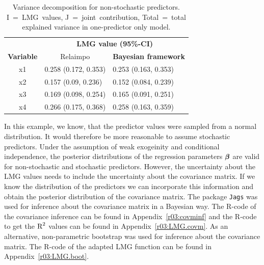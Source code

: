 \documentclass[11pt,a4paper,twoside]{book}\usepackage[]{graphicx}\usepackage[]{color}
\begin{document}
\begin{table}[h]
\caption{Variance decomposition for non-stochastic predictors. I~=~LMG~values, J~=~joint~contribution, Total~=~total explained variance in one-predictor only model.}
\centering
\begin{tabular}{cll}
   \toprule
   &\multicolumn{2}{c}{\textbf{LMG value (95\%-CI)}} \\
 \textbf{Variable} & \multicolumn{1}{c}{Relaimpo} & \textbf{Bayesian framework}  \\
  \hline
x1 & 0.258 (0.172, 0.353)  & 0.253 (0.163, 0.353)  \\ 
x2 & 0.157 (0.09, 0.236)  & 0.152 (0.084, 0.239)   \\ 
x3 & 0.169 (0.098, 0.254)  & 0.165 (0.091, 0.251)  \\ 
x4 & 0.266 (0.175, 0.368) & 0.258 (0.163, 0.359)  \\ 
   \bottomrule
\end{tabular}
\label{tbl:nonstochEx1relamip}
\end{table}

\FloatBarrier


In this example, we know, that the predictor values were sampled from a normal distribution. It would therefore be more reasonable to assume stochastic predictors. Under the assumption of weak exogeinity and conditional independence, the posterior distributions of the regression parameters ${\boldsymbol{\beta}}$ are valid for non-stochastic and stochastic predictors. However, the uncertainty about the LMG values needs to include the uncertainty about the covariance matrix. If we know the distribution of the predictors we can incorporate this information and obtain the posterior distribution of the covariance matrix. The package \texttt{Jags} was used for inference about the covariance matrix in a Bayesian way. The R-code of the covariance inference can be found in Appendix~\ref{r03:covminf} and the R-code to get the $\text{R}^2$ values can be found in Appendix~\ref{r03:LMG.covm}. As an alternative, non-parametric bootstrap was used for inference about the covariance matrix. The R-code of the adapted LMG function can be found in Appendix~\ref{r03:LMG.boot}.
\end{document}
